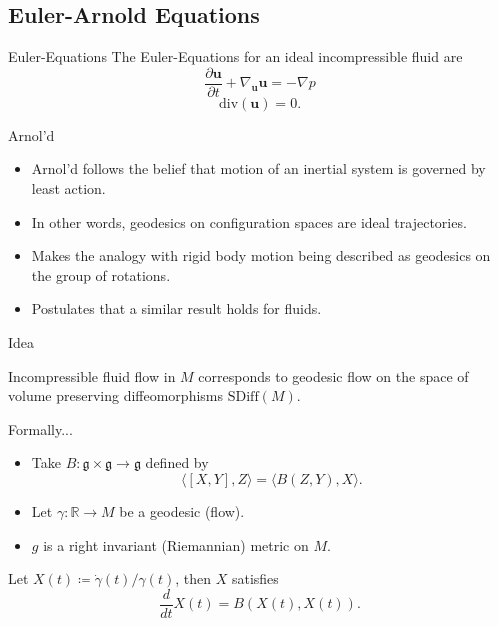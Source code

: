 \documentclass[usenames,dvipsnames]{beamer}
\theoremstyle{definition}
\theoremstyle{theorem}
\newcommand{\R}{\mathbb{R}}
\begin{document}
    \subsection{Euler-Arnold Equations}
        \begin{frame}{Euler-Equations}
            The Euler-Equations for an ideal incompressible fluid are
            \[
            \frac{\partial \mathbf{u}}{\partial t} + \nabla_\mathbf{u} \mathbf{u} = - \nabla p
            \]
            \[
            \mathrm{div}(\mathbf{u})=0.
            \]
        \end{frame}
    
        \begin{frame}{Arnol'd}
            \begin{itemize}
                \item Arnol'd follows the belief that motion of an inertial system is governed by least action.
                \item In other words, geodesics on configuration spaces are ideal trajectories.
                \item Makes the analogy with rigid body motion being described as geodesics on the group of rotations.
                \item Postulates that a similar result holds for fluids.
            \end{itemize}
        \end{frame}
    
        \begin{frame}{Idea}
            \begin{theorem}[Arnol'd]
            Incompressible fluid flow in $M$ corresponds to geodesic flow on the space of volume preserving diffeomorphisms $\mathrm{SDiff}(M)$.
            \end{theorem}
        \end{frame}
        
        \begin{frame}{Formally...}
            \begin{itemize}
                \item Take $B\colon \mathfrak{g}\times \mathfrak{g}\to \mathfrak{g}$ defined by
                \[
                \langle [X,Y],Z\rangle = \langle B(Z,Y),X\rangle.
                \]
                \item Let $\gamma \colon \R \to M$ be a geodesic (flow).
                \item $g$ is a right invariant (Riemannian) metric on $M$.
            \end{itemize}
            \begin{theorem}[Arnol'd]
            Let $X(t)\coloneqq \dot{\gamma}(t)/\gamma(t)$, then $X$ satisfies
            \[
            \frac{d}{dt}X(t)=B(X(t),X(t)).
            \]
            \end{theorem}
        \end{frame}
        
\end{document}
